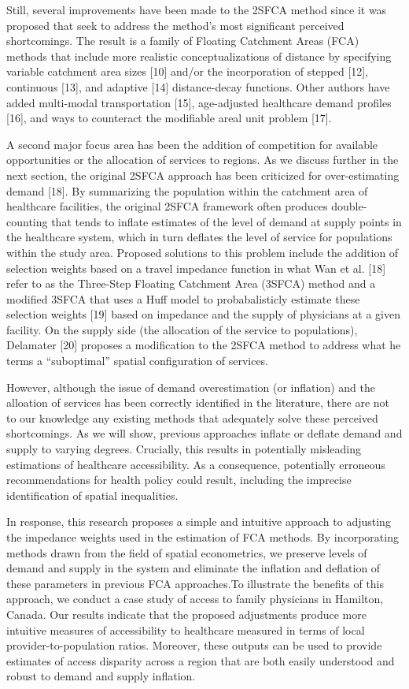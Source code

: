 \documentclass[10pt,letterpaper]{article}
\begin{document}
Still, several improvements have been made to the 2SFCA method since it
was proposed that seek to address the method's most significant
perceived shortcomings. The result is a family of Floating Catchment
Areas (FCA) methods that include more realistic conceptualizations of
distance by specifying variable catchment area sizes {[}10{]} and/or the
incorporation of stepped {[}12{]}, continuous {[}13{]}, and adaptive
{[}14{]} distance-decay functions. Other authors have added multi-modal
transportation {[}15{]}, age-adjusted healthcare demand profiles
{[}16{]}, and ways to counteract the modifiable areal unit problem
{[}17{]}.

A second major focus area has been the addition of competition for
available opportunities or the allocation of services to regions. As we
discuss further in the next section, the original 2SFCA approach has
been criticized for over-estimating demand {[}18{]}. By summarizing the
population within the catchment area of healthcare facilities, the
original 2SFCA framework often produces double-counting that tends to
inflate estimates of the level of demand at supply points in the
healthcare system, which in turn deflates the level of service for
populations within the study area. Proposed solutions to this problem
include the addition of selection weights based on a travel impedance
function in what Wan et al. {[}18{]} refer to as the Three-Step Floating
Catchment Area (3SFCA) method and a modified 3SFCA that uses a Huff
model to probabalisticly estimate these selection weights {[}19{]} based
on impedance and the supply of physicians at a given facility. On the
supply side (the allocation of the service to populations), Delamater
{[}20{]} proposes a modification to the 2SFCA method to address what he
terms a ``suboptimal'' spatial configuration of services.

However, although the issue of demand overestimation (or inflation) and
the alloation of services has been correctly identified in the
literature, there are not to our knowledge any existing methods that
adequately solve these perceived shortcomings. As we will show, previous
approaches inflate or deflate demand and supply to varying degrees.
Crucially, this results in potentially misleading estimations of
healthcare accessibility. As a consequence, potentially erroneous
recommendations for health policy could result, including the imprecise
identification of spatial inequalities.

In response, this research proposes a simple and intuitive approach to
adjusting the impedance weights used in the estimation of FCA methods.
By incorporating methods drawn from the field of spatial econometrics,
we preserve levels of demand and supply in the system and eliminate the
inflation and deflation of these parameters in previous FCA
approaches.To illustrate the benefits of this approach, we conduct a
case study of access to family physicians in Hamilton, Canada. Our
results indicate that the proposed adjustments produce more intuitive
measures of accessibility to healthcare measured in terms of local
provider-to-population ratios. Moreover, these outputs can be used to
provide estimates of access disparity across a region that are both
easily understood and robust to demand and supply inflation.
\end{document}
